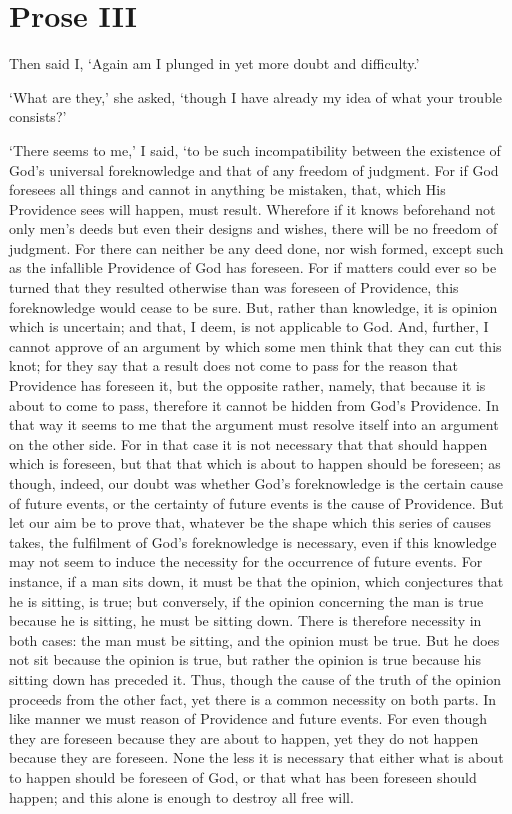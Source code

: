 \section{Prose III}

Then said I, `Again am I plunged in yet more doubt and difficulty.'

`What are they,' she asked, `though I have already my idea of what
your trouble consists?'

`There seems to me,' I said, `to be such incompatibility between the
existence of God's universal foreknowledge and that of any freedom of
judgment. For if God foresees all things and cannot in anything be
mistaken, that, which His Providence sees will happen, must result.
Wherefore if it knows beforehand not only men's deeds but even their
designs and wishes, there will be no freedom of judgment. For there
can neither be any deed done, nor wish formed, except such as the
infallible Providence of God has foreseen. For if matters could ever
so be turned that they resulted otherwise than was foreseen of
Providence, this foreknowledge would cease to be sure. But, rather
than knowledge, it is opinion which is uncertain; and that, I deem, is
not applicable to God. And, further, I cannot approve of an argument
by which some men think that they can cut this knot; for they say that
a result does not come  to pass for the reason that
Providence has foreseen it, but the opposite rather, namely, that
because it is about to come to pass, therefore it cannot be hidden
from God's Providence. In that way it seems to me that the argument
must resolve itself into an argument on the other side. For in that
case it is not necessary that that should happen which is foreseen,
but that that which is about to happen should be foreseen; as though,
indeed, our doubt was whether God's foreknowledge is the certain
cause of future events, or the certainty of future events is the cause
of Providence. But let our aim be to prove that, whatever be the shape
which this series of causes takes, the fulfilment of God's
foreknowledge is necessary, even if this knowledge may not seem to
induce the necessity for the occurrence of future events. For
instance, if a man sits down, it must be that the opinion, which
conjectures that he is sitting, is true; but conversely, if the
opinion concerning the man is true because he is sitting, he must be
sitting down. There is therefore necessity in both cases: the man must
be sitting, and the opinion must be true. But he does not sit
because the opinion is true, but rather the opinion is true because
his sitting down has preceded it. Thus, though the cause of the truth
of the opinion proceeds from the other fact, yet there is a common
necessity on both parts. In like manner we must reason of Providence
and future events. For even though they are foreseen because they are
about  to happen, yet they do not happen because they are
foreseen. None the less it is necessary that either what is about to
happen should be foreseen of God, or that what has been foreseen
should happen; and this alone is enough to destroy all free will.

